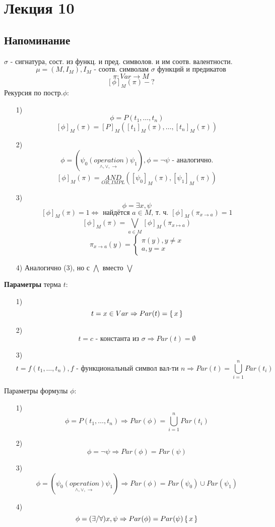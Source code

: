 \section{Лекция 10}
\subsection{Напоминание}
$\sigma$ - сигнатура, сост. из функц. и пред. символов. и им соотв. валентности.
\[
  \mu = (M, I_M), I_M \text{ - соотв. символам $\sigma$ функций и предикатов}
\]
\[
\pi \colon Var \rightarrow M
\]
\[
[\phi]_M(\pi) - ?
\]
Рекурсия по постр.$\phi$:
\begin{itemize}
  \item [1) ] \[
  \phi = P(t_1, \ldots, t_n)
  \]
  \[
  [\phi]_M(\pi) = [P]_M([t_1]_M(\pi), \ldots, [t_n]_M(\pi))
  \]
    \item [2) ] \[
    \phi = (\psi_0 \underset{\land, \lor, \rightarrow}{(operation)} \psi_1), \phi = \neg \psi \text{ - аналогично.}
    \]
    \[
    [\phi]_M(\pi) = \underset{OR, IMPL}{AND}([\psi_0]_M(\pi), [\psi_1]_M(\pi))
    \]
  \item[3) ] \[
  \phi = \exists x, \psi
  \]
  \[
  [\phi]_M(\pi) = 1 \iff \text{ найдётся $a \in M$, т. ч. $[\phi]_M (\pi_{x\rightarrow a}) = 1$}
  \]
  \[
  [\phi]_M(\pi) = \underset{a \in M}{\bigvee} [\phi]_M (\pi_{x \mapsto a}) 
  \]
  \[
  \pi_{x \rightarrow a}(y) = \begin{cases}
  \pi(y), y \neq x \\
  a, y = x
  \end{cases}
  \]
\item [4) ] Аналогично ($3$), но с $\bigwedge$ вместо $\bigvee$
\end{itemize}
\begin{definition}
\textbf{Параметры} терма $t$:
\begin{itemize}
  \item [1) ] \[
  t = x \in Var \Rightarrow Par(t) = \set{x}
  \]
\item [2) ] \[
  t = c \text{ - константа из $\sigma$} \Rightarrow Par(t) = \emptyset
\]
\item [3) ] \[
  t = f(t_1, \ldots, t_n), f \text{ - функциональный символ вал-ти $n$} \Rightarrow Par(t) = \bigcup_{i = 1}^{n} Par(t_i)
\]
\end{itemize}
\end{definition}
\begin{definition}
Параметры формулы $\phi$:
\begin{itemize}
  \item [1) ] \[
  \phi = P(t_1, \ldots, t_n) \Rightarrow Par(\phi) = \bigcup_{i = 1}^{n} Par(t_i)
  \]
\item [2) ] \[
\phi = \neg \psi \Rightarrow Par(\phi) = Par(\psi)
\]
\item[ 3) ] \[
\phi = (\psi_0 \underset{\land, \lor, \rightarrow}{(operation)} \psi_1) \Rightarrow Par(\phi) = Par(\psi_0) \cup Par(\psi_1)
\]
\item [4) ] \[
\phi = (\exists / \forall) x, \psi\Rightarrow Par(\phi) = Par(\psi) \set{x}
\]
\end{itemize}
\end{definition}
